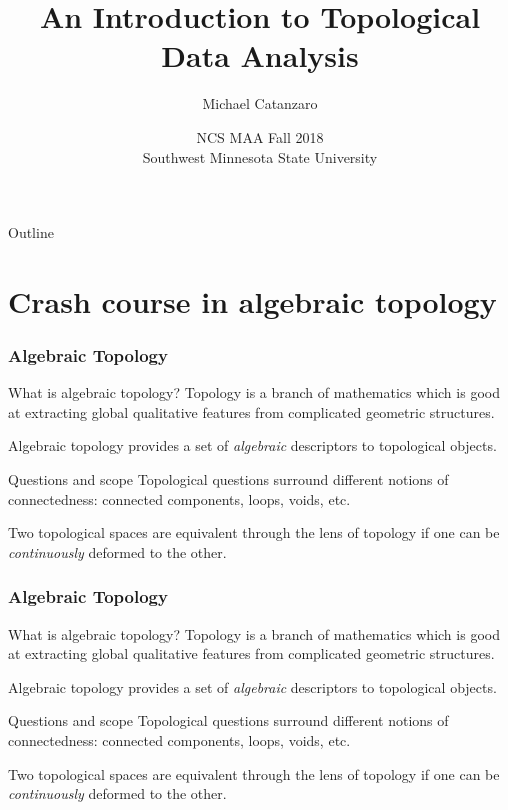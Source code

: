 \documentclass[usenames,dvipsnames,aspectratio=1610]{beamer}
\title{An Introduction to Topological Data Analysis}
\author{Michael Catanzaro}
\date{NCS MAA Fall 2018 \\ Southwest Minnesota State University}
\institute{Iowa State University}
\begin{document}
\begin{frame}[plain]
  \maketitle
\end{frame}


\begin{frame}{Outline}
  \tableofcontents
\end{frame}

\section{Crash course in algebraic topology}
\begin{frame}
  \frametitle{Algebraic Topology}
  \begin{block}{What is algebraic topology?}
    Topology is a branch of mathematics which is good at extracting global
    qualitative features from complicated geometric structures. 
    
    Algebraic topology provides a set of {\em algebraic} descriptors to topological objects.
  \end{block}
  \pause

  \begin{block}{Questions and scope}
    Topological questions surround different notions of connectedness:
    connected components, loops, voids, etc.

    Two topological spaces are equivalent through the lens of topology if one
    can be {\em continuously} deformed to the other. 
  \end{block}
\end{frame}

\begin{frame}
  \frametitle{Algebraic Topology}
  \begin{block}{What is algebraic topology?}
    Topology is a branch of mathematics which is good at extracting global
    qualitative features from complicated geometric structures. 
    
    Algebraic topology provides a set of {\em algebraic} descriptors to topological objects.
  \end{block}

  \begin{block}{Questions and scope}
    Topological questions surround different notions of connectedness:
    connected components, loops, voids, etc.

    Two topological spaces are equivalent through the lens of topology if one
    can be {\em continuously} deformed to the other. 
  \end{block}
\end{frame}
\end{document}
